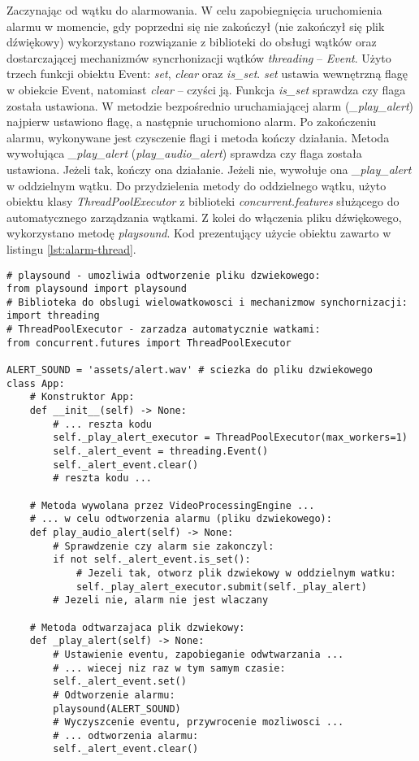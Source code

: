 Zaczynając od wątku do alarmowania. W celu zapobiegnięcia uruchomienia alarmu w momencie, gdy poprzedni się nie zakończył (nie zakończył się plik dźwiękowy) wykorzystano rozwiązanie z biblioteki do obsługi wątków oraz dostarczającej mechanizmów syncrhonizacji wątków \emph{threading} -- \emph{Event}. Użyto trzech funkcji obiektu Event: \emph{set}, \emph{clear} oraz \emph{is\_set}. \emph{set} ustawia wewnętrzną flagę w obiekcie Event, natomiast \emph{clear} -- czyści ją. Funkcja \emph{is\_set} sprawdza czy flaga została ustawiona. W metodzie bezpośrednio uruchamiającej alarm (\emph{\_play\_alert}) najpierw ustawiono flagę, a następnie uruchomiono alarm. Po zakończeniu alarmu, wykonywane jest czysczenie flagi i metoda kończy działania. Metoda wywołująca \emph{\_play\_alert} (\emph{play\_audio\_alert}) sprawdza czy flaga została ustawiona. Jeżeli tak, kończy ona działanie. Jeżeli nie, wywołuje ona \emph{\_play\_alert} w oddzielnym wątku. Do przydzielenia metody do oddzielnego wątku, użyto obiektu klasy \emph{ThreadPoolExecutor} z biblioteki \emph{concurrent.features} służącego do automatycznego zarządzania wątkami. Z kolei do włączenia pliku dźwiękowego, wykorzystano metodę \emph{playsound}.
Kod prezentujący użycie obiektu zawarto w listingu \ref{lst:alarm-thread}.

\begin{lstlisting}[caption={Kod uruchamiający alarm dźwiękowy oraz zapobiegający wielu symultaicznym uruchomieniom.}, label={lst:alarm-thread}]
# playsound - umozliwia odtworzenie pliku dzwiekowego:
from playsound import playsound 
# Biblioteka do obslugi wielowatkowosci i mechanizmow synchornizacji:
import threading
# ThreadPoolExecutor - zarzadza automatycznie watkami:
from concurrent.futures import ThreadPoolExecutor

ALERT_SOUND = 'assets/alert.wav' # sciezka do pliku dzwiekowego
class App:
    # Konstruktor App:
    def __init__(self) -> None:
        # ... reszta kodu
        self._play_alert_executor = ThreadPoolExecutor(max_workers=1)
        self._alert_event = threading.Event()
        self._alert_event.clear()    
        # reszta kodu ...

    # Metoda wywolana przez VideoProcessingEngine ...
    # ... w celu odtworzenia alarmu (pliku dzwiekowego):
    def play_audio_alert(self) -> None:
        # Sprawdzenie czy alarm sie zakonczyl:
        if not self._alert_event.is_set():
            # Jezeli tak, otworz plik dzwiekowy w oddzielnym watku: 
            self._play_alert_executor.submit(self._play_alert)
        # Jezeli nie, alarm nie jest wlaczany

    # Metoda odtwarzajaca plik dzwiekowy:
    def _play_alert(self) -> None:
        # Ustawienie eventu, zapobieganie odwtwarzania ...
        # ... wiecej niz raz w tym samym czasie: 
        self._alert_event.set()
        # Odtworzenie alarmu:
        playsound(ALERT_SOUND)
        # Wyczyszcenie eventu, przywrocenie mozliwosci ... 
        # ... odtworzenia alarmu:
        self._alert_event.clear()
\end{lstlisting}


